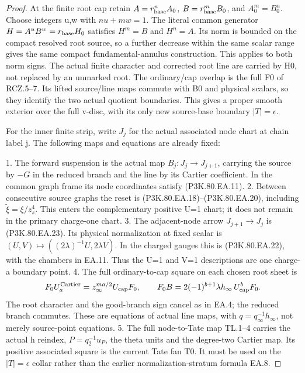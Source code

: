 \begin{proof}
At the finite root cap retain \(A=r_{\rm base}^n A_0\),
\(B=r_{\rm base}^mB_0\), and \(A_0^m=B_0^n\).
Choose integers u,w with \(nu+mw=1\). The literal common generator
\(H=A^uB^w=r_{\rm base}H_0\) satisfies \(H^m=B\) and
\(H^n=A\). Its norm is bounded on the compact resolved root source,
so a further decrease within the same scalar range gives the same
compact fundamental-annulus construction. This applies to both
norm signs. The actual finite character and corrected root line are
carried by H0, not replaced by an unmarked root. The ordinary/cap
overlap is the full F0 of RCZ.5--7. Its lifted source/line maps commute
with B0 and physical scalars, so they identify the two actual quotient
boundaries. This gives a proper smooth exterior over the full v-disc,
with its only new source-base boundary \(|T|=\epsilon\).

For the inner finite strip, write \(J_j\) for the actual associated
node chart at chain label j. The following maps and equations are
already fixed:

1. The forward suspension is the actual map
   \(B_j:J_j\to J_{j+1}\), carrying the source by \(-G\) in
   the reduced branch and the line by its Cartier coefficient. In
   the common graph frame its node coordinates satisfy (P3K.80.EA.11).
2. Between consecutive source graphs the reset is (P3K.80.EA.18)--(P3K.80.EA.20),
   including \(\widetilde\xi=\xi/z_s^4\). This enters the
   complementary positive U=1 chart; it does not remain in the
   primary charge-one chart.
3. The adjacent-node arrow \(J_{j+1}\to J_j\) is (P3K.80.EA.23).
   Its physical normalization at fixed scalar is
   \((U,V)\mapsto((2\lambda)^{-1}U,2\lambda V)\).
   In the charged gauges this is (P3K.80.EA.22), with the chambers in EA.11.
   Thus the U=1 and V=1 descriptions are one charge-a boundary point.
4. The full ordinary-to-cap square on each chosen root sheet is
   \[
      F_0 U_a^{\rm Cartier}
         =z_\infty^{ma/2}U_{\rm cap}F_0,
      \qquad
      F_0B=2(-1)^{b+1}\lambda h_\infty\,U_{\rm cap}^{b}F_0.
   \]
   The root character and the good-branch sign cancel as in EA.4;
   the reduced branch commutes. These are equations of actual line
   maps, with \(q=q_\infty^{-1}h_\infty\), not merely source-point equations.
5. The full node-to-Tate map TL.1--4 carries the
   actual h reindex, \(P=q_2^{-1}u_P\), the theta units and the
   degree-two Cartier map. Its positive associated square is the
   current Tate fan T0. It must be used on the \(|T|=\epsilon\)
   collar rather than the earlier normalization-stratum formula EA.8.




\end{proof}
